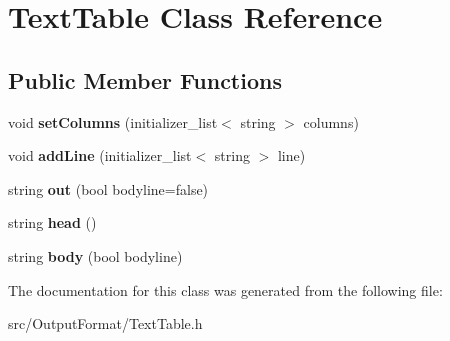 \hypertarget{class_text_table}{\section{Text\-Table Class Reference}
\label{class_text_table}
}
\subsection*{Public Member Functions}
\begin{DoxyCompactItemize}
\item 
\hypertarget{class_text_table_a558ebdc49b536653eaf68fb6dd74bfec}{void {\bfseries set\-Columns} (initializer\-\_\-list$<$ string $>$ columns)}\label{class_text_table_a558ebdc49b536653eaf68fb6dd74bfec}

\item 
\hypertarget{class_text_table_a38d3cc1d9880d7a8ac7dd7db9a3d21d4}{void {\bfseries add\-Line} (initializer\-\_\-list$<$ string $>$ line)}\label{class_text_table_a38d3cc1d9880d7a8ac7dd7db9a3d21d4}

\item 
\hypertarget{class_text_table_a16843b1cf3e1b243577a5f2e4a749782}{string {\bfseries out} (bool bodyline=false)}\label{class_text_table_a16843b1cf3e1b243577a5f2e4a749782}

\item 
\hypertarget{class_text_table_a45ec908de1ddca8d6674a7612ae12afa}{string {\bfseries head} ()}\label{class_text_table_a45ec908de1ddca8d6674a7612ae12afa}

\item 
\hypertarget{class_text_table_a8a42f699672ef21dad7d7b6ac5512a75}{string {\bfseries body} (bool bodyline)}\label{class_text_table_a8a42f699672ef21dad7d7b6ac5512a75}

\end{DoxyCompactItemize}


The documentation for this class was generated from the following file\-:\begin{DoxyCompactItemize}
\item 
src/\-Output\-Format/Text\-Table.\-h\end{DoxyCompactItemize}
